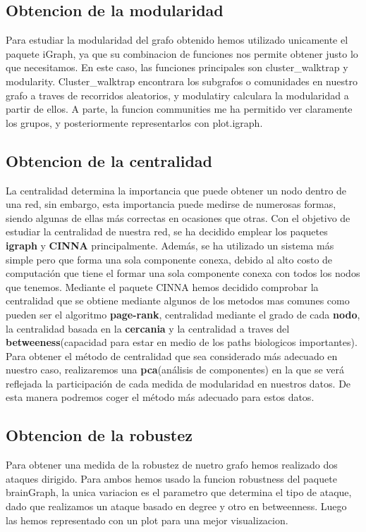 \subsection{Obtencion de la modularidad}
Para estudiar la modularidad del grafo obtenido hemos utilizado unicamente el paquete iGraph, ya que su combinacion de funciones nos permite obtener justo lo que necesitamos.
En este caso, las funciones principales son cluster\_walktrap y modularity. Cluster\_walktrap encontrara los subgrafos o comunidades en nuestro grafo a traves de recorridos aleatorios, y modulatiry calculara la modularidad a partir de ellos. 
A parte, la funcion communities me ha permitido ver claramente los grupos, y posteriormente representarlos con plot.igraph.

\subsection{Obtencion de la centralidad}
La centralidad determina la importancia que puede obtener un nodo dentro de una red, sin embargo, esta importancia puede medirse de numerosas formas, siendo algunas de ellas m\'as correctas en ocasiones que otras.
Con el objetivo de estudiar la centralidad de nuestra red, se ha decidido emplear los paquetes \textbf{igraph} y \textbf{CINNA} principalmente. Adem\'as, se ha utilizado un sistema m\'as simple pero que forma una sola componente conexa, debido al alto costo de computaci\'on que tiene el formar una sola componente conexa con todos los nodos que tenemos.
Mediante el paquete CINNA hemos decidido comprobar la centralidad que se obtiene mediante algunos de los metodos mas comunes como pueden ser el algoritmo \textbf{page-rank}, centralidad mediante el grado de cada \textbf{nodo}, la centralidad basada en la \textbf{cercania} y la centralidad a traves del \textbf{betweeness}(capacidad para estar en medio de los paths biologicos importantes).
Para obtener el m\'etodo de centralidad que sea considerado m\'as adecuado en nuestro caso, realizaremos una \textbf{pca}(an\'alisis de componentes) en la que se ver\'a reflejada la participaci\'on de cada medida de modularidad en nuestros datos. De esta manera podremos coger el método más adecuado para estos datos.

\subsection{Obtencion de la robustez}
Para obtener una medida de la robustez de nuetro grafo hemos realizado dos ataques dirigido. Para ambos hemos usado la funcion robustness del paquete brainGraph, la unica variacion es el parametro que determina el tipo de ataque, dado que realizamos un ataque basado en degree y otro en betweenness. Luego las hemos representado con un plot para una mejor visualizacion.
